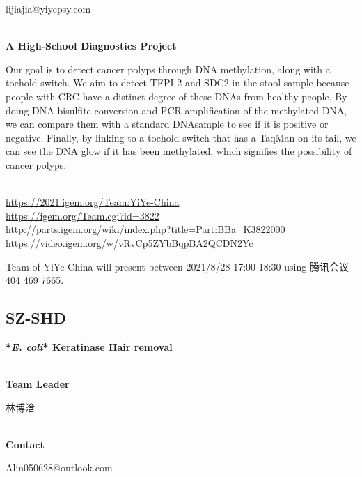   lijiajia@yiyepsy.com


\textbf{\\A High-School Diagnostics Project\\}\begin{spacing}{1.5}

Our goal is to detect cancer polyps through DNA methylation, along with a toehold switch. We aim to detect TFPI-2 and SDC2 in the stool sample because people with CRC have a distinct degree of these DNAs from healthy people. By doing DNA bisulfite conversion and PCR amplification of the methylated DNA, we can compare them with a standard DNAsample to see if it is positive or negative. Finally, by linking to a toehold switch that has a TaqMan on its tail, we can see the DNA glow if it has been methylated, which signifies the possibility of cancer polyps.\end{spacing}
\\

\url{https://2021.igem.org/Team:YiYe-China }\\
\url{https://igem.org/Team.cgi?id=3822 }\\
\url{http://parts.igem.org/wiki/index.php?title=Part:BBa_K3822000 }\\
\url{https://video.igem.org/w/vRvCp5ZYbBqpBA2QCDN2Yc }\\

\vfill{}









Team of YiYe-China will present between        2021/8/28 17:00-18:30 using 腾讯会议 404 469 7665.
\newpage


\subsection{\textcolor{Blu}{ SZ-SHD } }
\vspace{5mm}
\begin{center}
\large{
  \textbf{ *\textit{E. coli}* Keratinase Hair removal }\\

}
\end{center}
\textbf{\\Team Leader}

  林博浛


\textbf{\\Contact}

  Alin050628@outlook.com


